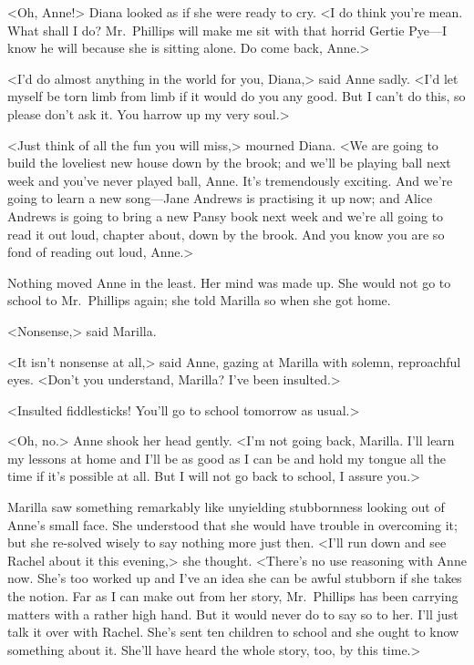 <Oh, Anne!> Diana looked as if she were ready to cry. <I do think you're mean. What shall I do? Mr.~Phillips will make me sit with that horrid Gertie Pye—I know he will because she is sitting alone. Do come back, Anne.>

<I'd do almost anything in the world for you, Diana,> said Anne sadly. <I'd let myself be torn limb from limb if it would do you any good. But I can't do this, so please don't ask it. You harrow up my very soul.>

<Just think of all the fun you will miss,> mourned Diana. <We are going to build the loveliest new house down by the brook; and we'll be playing ball next week and you've never played ball, Anne. It's tremendously exciting. And we're going to learn a new song—Jane Andrews is practising it up now; and Alice Andrews is going to bring a new Pansy book next week and we're all going to read it out loud, chapter about, down by the brook. And you know you are so fond of reading out loud, Anne.>

Nothing moved Anne in the least. Her mind was made up. She would not go to school to Mr.~Phillips again; she told Marilla so when she got home.

<Nonsense,> said Marilla.

<It isn't nonsense at all,> said Anne, gazing at Marilla with solemn, reproachful eyes. <Don't you understand, Marilla? I've been insulted.>

<Insulted fiddlesticks! You'll go to school tomorrow as usual.>

<Oh, no.> Anne shook her head gently. <I'm not going back, Marilla. I'll learn my lessons at home and I'll be as good as I can be and hold my tongue all the time if it's possible at all. But I will not go back to school, I assure you.>

Marilla saw something remarkably like unyielding stubbornness looking out of Anne's small face. She understood that she would have trouble in overcoming it; but she re-solved wisely to say nothing more just then. <I'll run down and see Rachel about it this evening,> she thought. <There's no use reasoning with Anne now. She's too worked up and I've an idea she can be awful stubborn if she takes the notion. Far as I can make out from her story, Mr.~Phillips has been carrying matters with a rather high hand. But it would never do to say so to her. I'll just talk it over with Rachel. She's sent ten children to school and she ought to know something about it. She'll have heard the whole story, too, by this time.>

